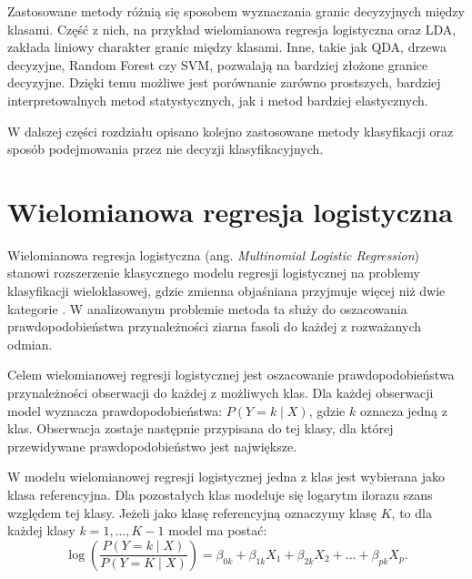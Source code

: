 \documentclass{report}
\begin{document}
Zastosowane metody różnią się sposobem wyznaczania granic decyzyjnych między klasami. Część z nich, na przykład wielomianowa regresja logistyczna oraz LDA, zakłada liniowy charakter granic między klasami. Inne, takie jak QDA, drzewa decyzyjne, Random Forest czy SVM, pozwalają na bardziej złożone granice decyzyjne. Dzięki temu możliwe jest porównanie zarówno prostszych, bardziej interpretowalnych metod statystycznych, jak i metod bardziej elastycznych.

W dalszej części rozdziału opisano kolejno zastosowane metody klasyfikacji oraz sposób podejmowania przez nie decyzji klasyfikacyjnych.


\section{Wielomianowa regresja logistyczna}






Wielomianowa regresja logistyczna (ang. \textit{Multinomial Logistic Regression}) stanowi rozszerzenie klasycznego modelu regresji logistycznej na problemy klasyfikacji wieloklasowej, gdzie zmienna objaśniana przyjmuje więcej niż dwie kategorie \cite{hastie2009, koronacki2005}. W analizowanym problemie metoda ta służy do oszacowania prawdopodobieństwa przynależności ziarna fasoli do każdej z rozważanych odmian.

Celem wielomianowej regresji logistycznej jest oszacowanie prawdopodobieństwa przynależności obserwacji do każdej z możliwych klas. Dla każdej obserwacji model wyznacza prawdopodobieństwa: \(P(Y=k \mid X)\), gdzie \(k\) oznacza jedną z klas. Obserwacja zostaje następnie przypisana do tej klasy, dla której przewidywane prawdopodobieństwo jest największe.

W modelu wielomianowej regresji logistycznej jedna z klas jest wybierana jako klasa referencyjna. Dla pozostałych klas modeluje się logarytm ilorazu szans względem tej klasy. Jeżeli jako klasę referencyjną oznaczymy klasę $K$, to dla każdej klasy $k = 1, \ldots, K-1$ model ma postać:
\[
\log \left( \frac{P(Y = k \mid X)}{P(Y = K \mid X)} \right)
=
\beta_{0k} + \beta_{1k}X_1 + \beta_{2k}X_2 + \ldots + \beta_{pk}X_p.
\]
\end{document}
